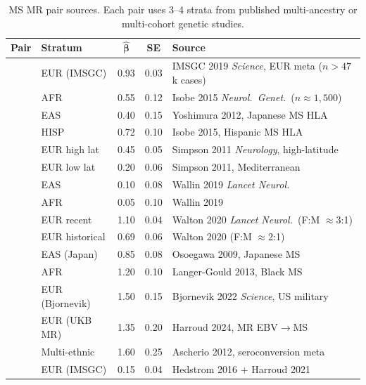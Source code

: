 \documentclass{article}
\begin{document}
\begin{table}[h]
\centering
\caption{MS MR pair sources. Each pair uses 3--4 strata from published multi-ancestry or multi-cohort genetic studies.}
\label{tab:mr-sources-ms}
\small
\begin{tabular}{@{}llccp{4.5cm}@{}}
\toprule
\textbf{Pair} & \textbf{Stratum} & $\boldsymbol{\hat\beta}$ & \textbf{SE} & \textbf{Source} \\
\midrule
{}
& EUR (IMSGC) & 0.93 & 0.03 & IMSGC 2019 \emph{Science}, EUR meta ($n > 47$k cases) \\
& AFR & 0.55 & 0.12 & Isobe 2015 \emph{Neurol.\ Genet.}\ ($n \approx 1{,}500$) \\
& EAS & 0.40 & 0.15 & Yoshimura 2012, Japanese MS HLA \\
& HISP & 0.72 & 0.10 & Isobe 2015, Hispanic MS HLA \\
\midrule
{}
& EUR high lat & 0.45 & 0.05 & Simpson 2011 \emph{Neurology}, high-latitude \\
& EUR low lat & 0.20 & 0.06 & Simpson 2011, Mediterranean \\
& EAS & 0.10 & 0.08 & Wallin 2019 \emph{Lancet Neurol.} \\
& AFR & 0.05 & 0.10 & Wallin 2019 \\
\midrule
{}
& EUR recent & 1.10 & 0.04 & Walton 2020 \emph{Lancet Neurol.}\ (F:M $\approx 3$:1) \\
& EUR historical & 0.69 & 0.06 & Walton 2020 (F:M $\approx 2$:1) \\
& EAS (Japan) & 0.85 & 0.08 & Osoegawa 2009, Japanese MS \\
& AFR & 1.20 & 0.10 & Langer-Gould 2013, Black MS \\
\midrule
{}
& EUR (Bjornevik) & 1.50 & 0.15 & Bjornevik 2022 \emph{Science}, US military \\
& EUR (UKB MR) & 1.35 & 0.20 & Harroud 2024, MR EBV$\to$MS \\
& Multi-ethnic & 1.60 & 0.25 & Ascherio 2012, seroconversion meta \\
\midrule
{}
& EUR (IMSGC) & 0.15 & 0.04 & Hedstrom 2016 + Harroud 2021 \\

\end{tabular}
\end{table}
\end{document}
